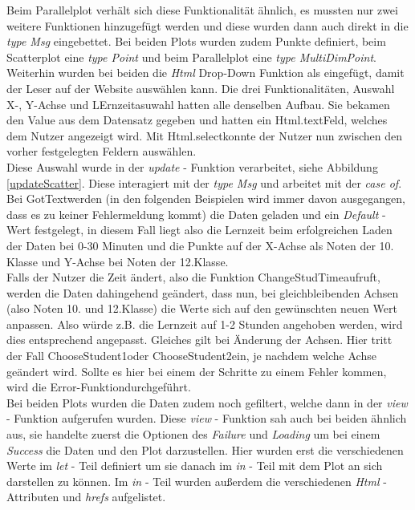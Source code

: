 \documentclass[usegeometry=true]{scrartcl}
\begin{document}
\noindent Beim Parallelplot verhält sich diese Funktionalität ähnlich, es mussten nur zwei weitere Funktionen hinzugefügt werden und diese wurden dann auch direkt in die \textit{type Msg} eingebettet.
Bei beiden Plots wurden zudem Punkte definiert, beim Scatterplot eine \textit{type Point} und beim Parallelplot eine \textit{type MultiDimPoint}.\\

\noindent Weiterhin wurden bei beiden die \textit{Html} Drop-Down Funktion als eingefügt, damit der Leser auf der Website auswählen kann. Die drei Funktionalitäten, Auswahl X-, Y-Achse und LErnzeitasuwahl hatten alle denselben Aufbau. Sie bekamen den Value aus dem Datensatz gegeben und hatten ein \glqq Html.text\grqq Feld, welches dem Nutzer angezeigt wird. Mit \glqq Html.select\grqq konnte der Nutzer nun zwischen den vorher festgelegten Feldern auswählen.\\

\noindent Diese Auswahl wurde in der \textit{update} - Funktion verarbeitet, siehe Abbildung \ref{updateScatter}. Diese interagiert mit der \textit{type Msg} und arbeitet mit der \textit{case of}. Bei \glqq GotText\grqq werden (in den folgenden Beispielen wird immer davon ausgegangen, dass es zu keiner Fehlermeldung kommt) die Daten geladen und ein \textit{Default} - Wert festgelegt, in diesem Fall liegt also die Lernzeit beim erfolgreichen Laden der Daten bei 0-30 Minuten und die Punkte auf der X-Achse als Noten der 10. Klasse und Y-Achse bei Noten der 12.Klasse.\\
Falls der Nutzer die Zeit ändert, also die Funktion \glqq ChangeStudTime\grqq aufruft, werden die Daten dahingehend geändert, dass nun, bei gleichbleibenden Achsen (also Noten 10. und 12.Klasse) die Werte sich auf den gewünschten neuen Wert anpassen. Also würde z.B. die Lernzeit auf 1-2 Stunden angehoben werden, wird dies entsprechend angepasst. Gleiches gilt bei Änderung der Achsen. Hier tritt der Fall \glqq ChooseStudent1\grqq oder \glqq ChooseStudent2\grqq ein, je nachdem welche Achse geändert wird.
Sollte es hier bei einem der Schritte zu einem Fehler kommen, wird die \glqq Error-Funktion\grqq durchgeführt.\\

\noindent Bei beiden Plots wurden die Daten zudem noch gefiltert, welche dann in der \textit{view} - Funktion aufgerufen wurden. Diese \textit{view} - Funktion sah auch bei beiden ähnlich aus, sie handelte zuerst die Optionen des \textit{Failure} und \textit{Loading} um bei einem \textit{Success} die Daten und den Plot darzustellen. Hier wurden erst die verschiedenen Werte im \textit{let} - Teil definiert um sie danach im \textit{in} - Teil mit dem Plot an sich darstellen zu können. Im \textit{in} - Teil wurden außerdem die verschiedenen \textit{Html} - Attributen und \textit{hrefs} aufgelistet.\\
\end{document}
